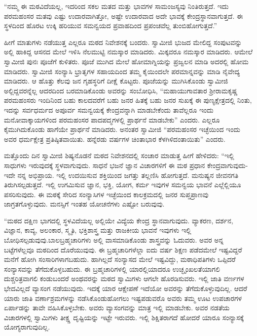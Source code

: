  “ನಮ್ಮ ಈ ಮಠವಿದೆಯಲ್ಲ, ಇದರಿಂದ ಸಕಲ ಮತದ ಮತ್ತು ಭಾವಗಳ ಸಾಮಂಜಸ್ಯವು ನಿಂತಿರುತ್ತದೆ. ಇದು ಪರಮಹಂಸರ ಮತವು ಎಷ್ಟು ಉದಾರವಾಗಿತ್ತೋ, ಅಷ್ಟೇ ಉದಾರವಾದ ಅದೇ ಭಾವಕ್ಕೆ ಕೇಂದ್ರಸ್ಥಾನವಾಗುತ್ತದೆ. ಈ ಸ್ಥಳದಿಂದ ಹೊರಟ ಉಕ್ಕಿ ಹರಿಯುವ ಸಮನ್ವಯದ ಪ್ರವಾಹದಿಂದ ಪ್ರಪಂಚವೆಲ್ಲ ತುಂಬಿಹೋಗುತ್ತದೆ.” 

 ಹೀಗೆ ಮಾತುಗಳು ನಡೆಯುತ್ತ ಎಲ್ಲರೂ ಮಠದ ನಿವೇಶನಕ್ಕೆ ಬಂದರು. ಸ್ವಾಮೀಜಿ ಭುಜದ ಮೇಲಿದ್ದ ಸಂಪುಟವನ್ನು ಅಲ್ಲಿ ಹಾಕಿದ್ದ ಆಸನದ ಮೇಲೆ ಇಳಿಸಿ ನೆಲಮುಟ್ಟಿ ನಮಸ್ಕಾರ ಮಾಡಿದರು. ಮಿಕ್ಕವರೂ ನಮಸ್ಕಾರ ಮಾಡಿದರು. ಆಮೇಲೆ ಸ್ವಾಮೀಜಿ ಪುನಃ ಪೂಜೆಗೆ ಕುಳಿತರು. ಪೂಜೆ ಮುಗಿದ ಮೇಲೆ ಹೋಮಾಗ್ನಿಯನ್ನು ಪ್ರಜ್ವಲನ ಮಾಡಿ ಅದರಲ್ಲಿ ಹೋಮ ಮಾಡಿದರು. ಸ್ವಾಮೀಜಿ ಸಂನ್ಯಾಸಿ ಭ್ರಾತೃಗಳ ಸಹಾಯದಿಂದ ತಮ್ಮ ಕೈಯಿಂದಲೇ ಪರಮಾನ್ನವನ್ನು ಮಾಡಿ ನೈವೇದ್ಯ ಮಾಡಿದರು. ಆ ಹೊತ್ತು ಕೆಲವು ಜನ ಗೃಹಸ್ಥರಿಗೆ ದೀಕ್ಷೆ ಕೊಟ್ಟರು. ಪೂಜೆಯನ್ನು ಮುಗಿಸಿಕೊಂಡು ಸ್ವಾಮೀಜಿ ಅಲ್ಲಿದ್ದವರನ್ನೆಲ್ಲ ಆದರದಿಂದ ಬರಮಾಡಿಕೊಂಡು ಅವರನ್ನು ಸಂಬೋಧಿಸಿ, “ಮಹಾಯುಗಾವತಾರ ಶ‍್ರೀರಾಮಕೃಷ್ಣ ಪರಮಹಂಸರು ಇಂದಿನಿಂದ ಬಹು ಕಾಲದವರೆಗೆ ಬಹು ಜನರ ಹಿತಕ್ಕೆ ಬಹು ಜನರ ಸುಖಕ್ಕೆ ಈ ಪುಣ್ಯಕ್ಷೇತ್ರದಲ್ಲಿ ನಿಂತು, ಇದನ್ನು ಸರ್ವಧರ್ಮದ ಅಪೂರ್ವ ಸಮನ್ವಯಕ್ಕೆ ಕೇಂದ್ರವನ್ನಾಗಿ ಮಾಡಬೇಕೆಂದು ತಾವೆಲ್ಲರೂ ಇಂದು ಮನೋವಾಕ್ಕಾಯಗಳಿಂದ ಪರಮಹಂಸರ ಪಾದಪದ್ಮಗಳಲ್ಲಿ ಪ್ರಾರ್ಥನೆ ಮಾಡಬೇಕು” ಎಂದರು. ಎಲ್ಲರೂ ಕೈಮುಗಿದುಕೊಂಡು ಹಾಗೆಯೇ ಪ್ರಾರ್ಥನೆ ಮಾಡಿದರು. ಅನಂತರ ಸ್ವಾಮೀಜಿ “ಪರಮಹಂಸರ ಇಚ್ಛೆಯಿಂದ ಇಂದು ಅವರ ಧರ್ಮಕ್ಷೇತ್ರ ಪ್ರತಿಷ್ಠಿತವಾಯಿತು. ಹನ್ನೆರಡು ವರ್ಷಗಳ ಚಿಂತಾಭಾರ ಕೆಳಗಿಳಿದಂತಾಯಿತು” ಎಂದರು. 

 ಮತ್ತೊಂದು ದಿನ ಸ್ವಾಮೀಜಿ ಶಿಷ್ಯನೊಡನೆ ಮಠದ ನಿವೇಶನದಲ್ಲಿ ಸಂಚಾರ ಮಾಡುತ್ತ ಹೀಗೆ ಹೇಳಿದರು: “ಇಲ್ಲಿ ಸಾಧುಗಳು ಇರುವುದಕ್ಕೆ ಸ್ಥಳವಾಗುವುದು. ಸಾಧನೆ ಭಜನೆ ಜ್ಞಾನ ವಿಚಾರಗಳಿಗೆ ಈ ಮಠ ಪ್ರಧಾನ ಕೇಂದ್ರವಾಗುವುದು- ಇದೇ ನನ್ನ ಅಭಿಪ್ರಾಯ. ಇಲ್ಲಿ ಉದಯಿಸುವ ಶಕ್ತಿಯಿಂದ ಜಗತ್ತು ತಲ್ಲಣಿಸಿ ಹೋಗುತ್ತದೆ. ಮನುಷ್ಯನ ಜೀವನಗತಿ ತಿರುಗಿಸಲ್ಪಡುತ್ತದೆ. ಇಲ್ಲಿ ಉಗಮಿಸುವ ಜ್ಞಾನ, ಭಕ್ತಿ, ಯೋಗ, ಕರ್ಮ ಇವುಗಳ ಸಮನ್ವಯ ಭಾವನೆ ಎಲ್ಲೆಲ್ಲಿಯೂ ಪಸರಿಸುವುದು. ಈ ಮಠಕ್ಕೆ ಸೇರಿದ ಸಂನ್ಯಾಸಿಗಳ ಇಚ್ಛೆಯಿಂದ ಕಾಲಕ್ರಮದಲ್ಲಿ ಜನರ ಸುಪ್ತಪ್ರಾಣವು ಜಾಗ್ರತಗೊಳ್ಳುವುದು. ಮನಸ್ಸಿಗೆ ಇಂತಹ ಯೋಚನೆಗಳು ಎಷ್ಟೋ ಬರುವುವು. 

 “ಮಠದ ದಕ್ಷಿಣ ಭಾಗದಲ್ಲಿ ಸ್ಥಳವಿದೆಯಲ್ಲ ಅಲ್ಲಿಯೇ ವಿದ್ಯೆಯ ಕೇಂದ್ರ ಸ್ಥಾನವಾಗುವುದು. ವ್ಯಾಕರಣ, ದರ್ಶನ, ವಿಜ್ಞಾನ, ಕಾವ್ಯ, ಅಲಂಕಾರ, ಸ್ಮೃತಿ, ಭಕ್ತಿಶಾಸ್ತ್ರ ಮತ್ತು ರಾಜಕೀಯ ಭಾವನೆ ಇವುಗಳು ಇಲ್ಲಿ ಬೋಧಿಸಲ್ಪಡುವುವು.\break ಬಾಲಬ್ರಹ್ಮಚಾರಿಗಳು ಅಲ್ಲಿ ವಾಸಮಾಡಿಕೊಂಡು ಶಾಸ್ತ್ರವನ್ನು ಓದುವರು. ಅವರ ಅನ್ನ ಬಟ್ಟೆಗಳೆಲ್ಲವೂ ಮಠದಿಂದ ದೊರೆಯುವುವು. ಈ ಬ್ರಹ್ಮಚಾರಿಗಳೆಲ್ಲಾ ಐದು ವರ್ಷ ಶಿಕ್ಷಣ ಪಡೆದಮೇಲೆ ಇಷ್ಟವಿದ್ದರೆ ಮನೆಗೆ ಹೋಗಿ ಸಂಸಾರಿಗಳಾಗಬಹುದು. ಹಾಗಿಲ್ಲದೆ ಸಂನ್ಯಾಸದ ಮೇಲೆ ಇಷ್ಟವಿದ್ದು, ಮಠಾಧಿಪತಿಗಳು ಒಪ್ಪಿದರೆ ಸಂನ್ಯಾಸವನ್ನು ತೆಗೆದುಕೊಳ್ಳಬಹುದು. ಈ ಬ್ರಹ್ಮಚಾರಿಗಳಲ್ಲಿ ಯಾರಲ್ಲಿಯಾದರೂ ಉಚ್ಛೃಂಖಲತೆಯಾಗಲಿ ದುಶ್ಚರಿತ್ರವಾಗಲಿ ಕಂಡುಬಂದರೆ ಅಂಥವರನ್ನು ಮಠದ ಸ್ವಾಮಿಗಳು ಆಗಲೇ‌ ಹೊರಡಿಸುವರು. ಇಲ್ಲಿ ಜಾತಿ ವರ್ಣಗಳ ಭೇದವಿಲ್ಲದೆ ವ್ಯಾಸಂಗ ನಡೆಯುವುದು. ಇದಕ್ಕೆ ಯಾರ ಆಕ್ಷೇಪಣೆ ಇದೆಯೋ ಅವರನ್ನು ತೆಗೆದುಕೊಳ್ಳುವುದಿಲ್ಲ. ಆದರೆ ಯಾರು ಜಾತಿ ವರ್ಣಾಶ್ರಮಗಳನ್ನು ನಡೆಸಿಕೊಂಡುಹೋಗಲು ಇಷ್ಟಪಡುವರೊ ಅವರು ತಮ್ಮ ಊಟ ಉಪಚಾರಗಳ ಏರ್ಪಾಡನ್ನು ತಾವೇ ವಹಿಸಿಕೊಳ್ಳಬೇಕು. ಅವರು ವ್ಯಾಸಂಗವನ್ನು ಮಾತ್ರ ಇಲ್ಲಿ ಮಾಡಬೇಕು. ಅವರ ನಡತೆಯ ವಿಚಾರಗಳಲ್ಲಿ ಸ್ವಾಮಿಗಳು ತೀಕ್ಷ್ಣ ದೃಷ್ಟಿಯನ್ನು ಇಟ್ಟೇ ಇರುವರು. ಇಲ್ಲಿ ಶಿಕ್ಷಿತರಾಗದೆ ಹೋದರೆ ಯಾರೂ ಸಂನ್ಯಾಸಕ್ಕೆ ಯೋಗ್ಯರಾಗುವುದಿಲ್ಲ. 

